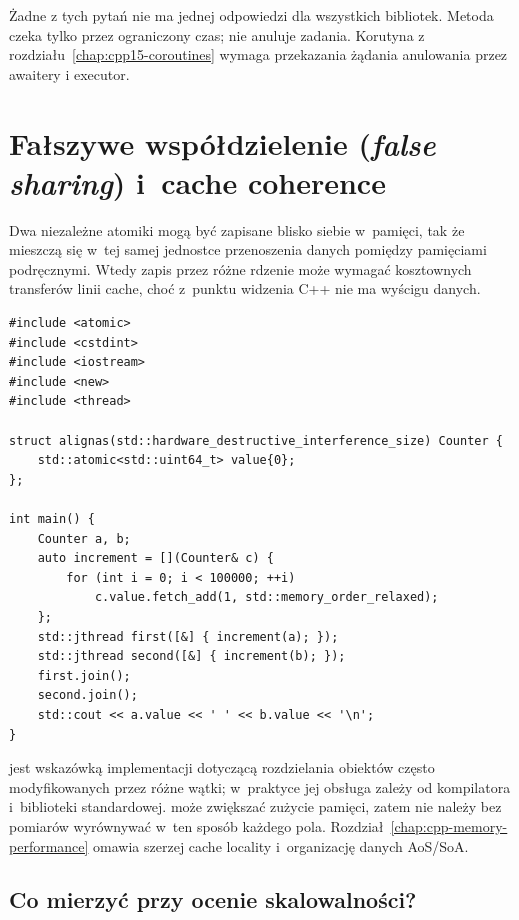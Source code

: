 Żadne z tych pytań nie ma jednej odpowiedzi dla wszystkich bibliotek.
Metoda  czeka tylko przez ograniczony czas;
nie anuluje zadania. Korutyna z rozdziału~\ref{chap:cpp15-coroutines}
wymaga przekazania żądania anulowania przez awaitery i executor.

\section{Fałszywe współdzielenie (\emph{false sharing}) i~cache coherence}
\label{sec:cpp16-false-sharing}

Dwa niezależne atomiki mogą być zapisane blisko siebie w~pamięci,
tak że mieszczą się w~tej samej jednostce przenoszenia danych
pomiędzy pamięciami podręcznymi. Wtedy zapis przez różne rdzenie
może wymagać kosztownych transferów linii cache, choć z~punktu
widzenia C++ nie ma wyścigu danych.

\begin{lstlisting}[caption={Rozdzielenie intensywnie zapisywanych liczników (C++20; stała wyrównania od C++17).}]
#include <atomic>
#include <cstdint>
#include <iostream>
#include <new>
#include <thread>

struct alignas(std::hardware_destructive_interference_size) Counter {
    std::atomic<std::uint64_t> value{0};
};

int main() {
    Counter a, b;
    auto increment = [](Counter& c) {
        for (int i = 0; i < 100000; ++i)
            c.value.fetch_add(1, std::memory_order_relaxed);
    };
    std::jthread first([&] { increment(a); });
    std::jthread second([&] { increment(b); });
    first.join();
    second.join();
    std::cout << a.value << ' ' << b.value << '\n';
}
\end{lstlisting}

 jest wskazówką
implementacji dotyczącą rozdzielania obiektów często modyfikowanych
przez różne wątki; w~praktyce jej obsługa zależy od kompilatora
i~biblioteki standardowej.  może zwiększać zużycie
pamięci, zatem nie należy bez pomiarów wyrównywać w~ten sposób
każdego pola. Rozdział~\ref{chap:cpp-memory-performance} omawia szerzej cache locality i~organizację
danych AoS/SoA.

\subsection{Co mierzyć przy ocenie skalowalności?}

